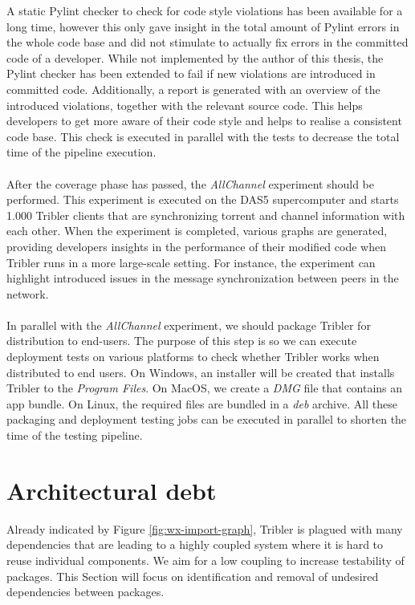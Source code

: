 A static Pylint checker to check for code style violations has been available for a long time, however this only gave insight in the total amount of Pylint errors in the whole code base and did not stimulate to actually fix errors in the committed code of a developer. While not implemented by the author of this thesis, the Pylint checker has been extended to fail if new violations are introduced in committed code. Additionally, a report is generated with an overview of the introduced violations, together with the relevant source code. This helps developers to get more aware of their code style and helps to realise a consistent code base. This check is executed in parallel with the tests to decrease the total time of the pipeline execution.\\\\
After the coverage phase has passed, the \emph{AllChannel} experiment should be performed. This experiment is executed on the DAS5 supercomputer and starts 1.000 Tribler clients that are synchronizing torrent and channel information with each other. When the experiment is completed, various graphs are generated, providing developers insights in the performance of their modified code when Tribler runs in a more large-scale setting. For instance, the experiment can highlight introduced issues in the message synchronization between peers in the network.\\\\
In parallel with the \emph{AllChannel} experiment, we should package Tribler for distribution to end-users. The purpose of this step is so we can execute deployment tests on various platforms to check whether Tribler works when distributed to end users. On Windows, an installer will be created that installs Tribler to the \emph{Program Files}. On MacOS, we create a \emph{DMG} file that contains an app bundle. On Linux, the required files are bundled in a \emph{deb} archive. All these packaging and deployment testing jobs can be executed in parallel to shorten the time of the testing pipeline.

\section{Architectural debt}
Already indicated by Figure \ref{fig:wx-import-graph}, Tribler is plagued with many dependencies that are leading to a highly coupled system where it is hard to reuse individual components. We aim for a low coupling to increase testability of packages. This Section will focus on identification and removal of undesired dependencies between packages.

